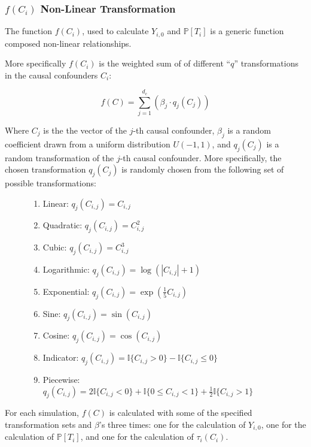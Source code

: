 \documentclass{article}
\numberwithin{equation}{section}
\begin{document}
\subsubsection{$f(C_i)$ Non-Linear Transformation}
\label{subsubsec:f_c_non_linear_relationship}

The function $f(C_i)$, used to calculate $Y_{i, 0}$ and $\mathbb{P}[T_i]$ is a generic function composed non-linear relationships.

More specifically $f(C_i)$ is the weighted sum of of different ``$q$'' transformations in the causal confounders $C_i$:

\begin{equation}
    f(C) = \sum_{j=1}^{d_c} \left( \beta_{j} \cdot q_j(C_{j}) \right)
\end{equation}

Where $C_{j}$ is the the vector of the $j$-th causal confounder, $\beta_j$ is a random coefficient drawn from a uniform distribution $U(-1, 1)$, and $q_j(C_{j})$ is a random transformation of the $j$-th causal confounder. More specifically, the chosen transformation $q_j(C_{j})$ is randomly chosen from the following set of possible transformations:

\begin{figure}[H]
\begin{enumerate}[label=\roman*.]
    \item Linear: $q_j(C_{i, j}) = C_{i, j}$
    \item Quadratic: $q_j(C_{i, j}) = C_{i, j}^2$
    \item Cubic: $q_j(C_{i, j}) = C_{i, j}^3$
    \item Logarithmic: $q_j(C_{i, j}) = \log(|C_{i, j}| + 1)$
    \item Exponential: $q_j(C_{i, j}) = \exp(\frac{1}{5} C_{i, j})$
    \item Sine: $q_j(C_{i, j}) = \sin(C_{i, j})$
    \item Cosine: $q_j(C_{i, j}) = \cos(C_{i, j})$
    \item Indicator: $q_j(C_{i, j}) = \mathbb{I}\{C_{i, j} > 0\} - \mathbb{I}\{C_{i, j} \leq 0\}$
    \item Piecewise: $q_j(C_{i, j}) = 2 \mathbb{I}\{C_{i, j} < 0\} + \mathbb{I}\{0 \leq C_{i, j} < 1\} + \frac{1}{2} \mathbb{I}\{ C_{i, j} > 1\}$
\end{enumerate}
\end{figure}

For each simulation, $f(C)$ is calculated with some of the specified transformation sets and $\beta$'s three times: one for the calculation of $Y_{i, 0}$, one for the calculation of $\mathbb{P}[T_i]$, and one for the calculation of $\tau_i(C_i)$.
\end{document}
